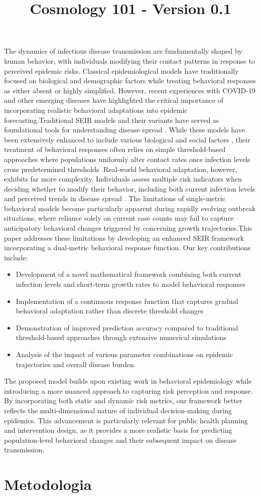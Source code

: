 \documentclass{article}\usepackage{graphicx} \usepackage{amsmath} \usepackage{colortbl}\title{Cosmology 101 - Version 0.1}
\begin{document}
The dynamics of infectious disease transmission are fundamentally shaped by human behavior, with individuals modifying their contact patterns in response to perceived epidemic risks. Classical epidemiological models have traditionally focused on biological and demographic factors while treating behavioral responses as either absent or highly simplified. However, recent experiences with COVID-19 and other emerging diseases have highlighted the critical importance of incorporating realistic behavioral adaptations into epidemic forecasting.Traditional SEIR models and their variants have served as foundational tools for understanding disease spread \cite{anderson1992infectious}. While these models have been extensively enhanced to include various biological and social factors \cite{hethcote2000mathematics}, their treatment of behavioral responses often relies on simple threshold-based approaches where populations uniformly alter contact rates once infection levels cross predetermined thresholds \cite{funk2010modelling}.Real-world behavioral adaptation, however, exhibits far more complexity. Individuals assess multiple risk indicators when deciding whether to modify their behavior, including both current infection levels and perceived trends in disease spread \cite{wang2020impact}. The limitations of single-metric behavioral models become particularly apparent during rapidly evolving outbreak situations, where reliance solely on current case counts may fail to capture anticipatory behavioral changes triggered by concerning growth trajectories.This paper addresses these limitations by developing an enhanced SEIR framework incorporating a dual-metric behavioral response function. Our key contributions include:\begin{itemize}\item Development of a novel mathematical framework combining both current infection levels and short-term growth rates to model behavioral responses\item Implementation of a continuous response function that captures gradual behavioral adaptation rather than discrete threshold changes\item Demonstration of improved prediction accuracy compared to traditional threshold-based approaches through extensive numerical simulations\item Analysis of the impact of various parameter combinations on epidemic trajectories and overall disease burden\end{itemize}The proposed model builds upon existing work in behavioral epidemiology \cite{verelst2016behavioural} while introducing a more nuanced approach to capturing risk perception and response. By incorporating both static and dynamic risk metrics, our framework better reflects the multi-dimensional nature of individual decision-making during epidemics. This advancement is particularly relevant for public health planning and intervention design, as it provides a more realistic basis for predicting population-level behavioral changes and their subsequent impact on disease transmission.\section{Metodologia}
\end{document}
